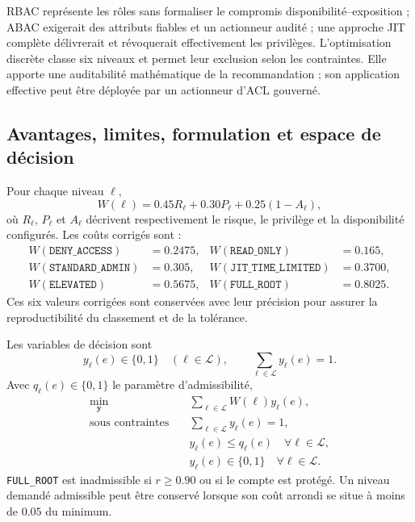 \documentclass[11pt,a4paper,oneside]{report}
\theoremstyle{definition}
\theoremstyle{plain}
\begin{document}
RBAC représente les rôles sans formaliser le compromis disponibilité--exposition ;
ABAC exigerait des attributs fiables et un actionneur audité ; une approche JIT
complète délivrerait et révoquerait effectivement les privilèges. L'optimisation
discrète classe six niveaux et permet leur exclusion selon les contraintes. Elle
apporte une auditabilité mathématique de la recommandation ; son application
effective peut être déployée par un actionneur d'ACL gouverné.

\subsection*{Avantages, limites, formulation et espace de décision}

Pour chaque niveau $\ell$,
\begin{equation}
W(\ell)=0.45R_\ell+0.30P_\ell+0.25(1-A_\ell),
\label{eq:ai-ro-privilege-cost}
\end{equation}
où $R_\ell$, $P_\ell$ et $A_\ell$ décrivent respectivement le risque, le privilège
et la disponibilité configurés. Les coûts corrigés sont :
\begin{align*}
W(\texttt{DENY\_ACCESS})&=0.2475,&
W(\texttt{READ\_ONLY})&=0.165,\\
W(\texttt{STANDARD\_ADMIN})&=0.305,&
W(\texttt{JIT\_TIME\_LIMITED})&=0.3700,\\
W(\texttt{ELEVATED})&=0.5675,&
W(\texttt{FULL\_ROOT})&=0.8025.
\end{align*}
Ces six valeurs corrigées sont conservées avec leur précision pour assurer la
reproductibilité du classement et de la tolérance.

Les variables de décision sont
\[
y_\ell(e)\in\{0,1\}\quad(\ell\in\mathcal{L}),\qquad
\sum_{\ell\in\mathcal{L}}y_\ell(e)=1.
\]
Avec $q_\ell(e)\in\{0,1\}$ le paramètre d'admissibilité,
\begin{align}
\min_{\mathbf{y}}\quad&
\sum_{\ell\in\mathcal{L}}W(\ell)y_\ell(e),
\label{eq:ai-ro-privilege-objective}\\
\text{sous contraintes}\quad&
\sum_{\ell\in\mathcal{L}}y_\ell(e)=1,\nonumber\\
&y_\ell(e)\leq q_\ell(e)\quad\forall\ell\in\mathcal{L},\nonumber\\
&y_\ell(e)\in\{0,1\}\quad\forall\ell\in\mathcal{L}.
\end{align}
\texttt{FULL\_ROOT} est inadmissible si $r\geq0.90$ ou si le compte est protégé.
Un niveau demandé admissible peut être conservé lorsque son coût arrondi se situe
à moins de $0.05$ du minimum.
\end{document}
